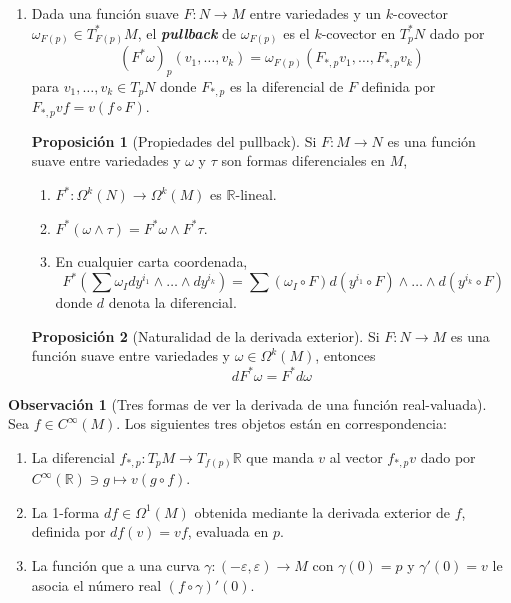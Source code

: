 \documentclass[spanish]{article}
\theoremstyle{definition}
\newtheorem*{prop}{Proposición}
\newtheorem*{obs}{Observación}
\newcommand{\R}{\mathbb{R}}
\newcommand{\Cinf}{C^\infty}
\begin{document}
\begin{enumerate}
		
		\item Dada una función suave $F:N\to M$ entre variedades y un $k$-covector $\omega_{F(p)}\in T^*_{F(p)}M$, el \textbf{\textit{pullback}} de $\omega_{F(p)}$ es el $k$-covector en $T_p^*N$ dado por
		\[(F^*\omega)_p(v_1,\ldots,v_k)=\omega_{F(p)}(F_{*,p}v_1,\ldots,F_{*,p}v_k)\]
		para $v_1,\ldots,v_k\in T_pN$ donde $F_{*,p}$ es la diferencial de $F$ definida por $F_{*,p}vf=v(f\circ F)$.
		
		
		\begin{prop}[Propiedades del pullback]
			Si $F:M\to N$ es una función suave entre variedades y $\omega$ y $\tau$ son formas diferenciales en $M$,
			\begin{enumerate}
				\item $F^*:\Omega^k(N)\to\Omega^k(M)$ es $\R$-lineal.
				\item $F^*(\omega\wedge\tau)=F^*\omega\wedge F^*\tau$.
				\item En cualquier carta coordenada,
				\[F^*\left(\sum\omega_Idy^{i_1}\wedge\ldots\wedge dy^{i_k}\right)=\sum(\omega_I\circ F)d(y^{i_1}\circ F)\wedge\ldots\wedge d(y^{i_k}\circ F)\]
				donde $d$ denota la diferencial.
			\end{enumerate}
		\end{prop}
		
		\begin{prop}[Naturalidad de la derivada exterior]
			Si $F:N\to M$ es una función suave entre variedades y $\omega\in\Omega^k(M)$, entonces
			\[dF^*\omega=F^*d\omega\]
		\end{prop}
		
		
		
		
	\end{enumerate}
	
	\begin{obs}[Tres formas de ver la derivada de una función real-valuada]
		Sea $f\in\Cinf(M)$. Los siguientes tres objetos están en correspondencia:
		\begin{enumerate}
			\item La diferencial $f_{*,p}:T_pM\to T_{f(p)}\R$ que manda $v$ al vector $f_{*,p}v$ dado por $\Cinf(\R)\ni g\mapsto v(g\circ f)$.
			\item La 1-forma $df\in \Omega^1(M)$ obtenida mediante la derivada exterior de $f$, definida por $df(v)=vf$, evaluada en $p$.
			\item La función que a una curva $\gamma:(-\varepsilon,\varepsilon)\to M$ con $\gamma(0)=p$ y $\gamma'(0)=v$ le asocia el número real $(f\circ \gamma)'(0)$.
		\end{enumerate}
	\end{obs}
	
\end{document}
